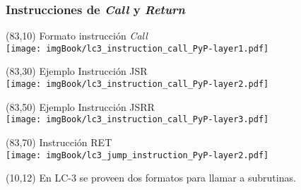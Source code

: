\documentclass[aspectratio=169]{beamer}
\begin{document}
\begin{frame}[t,fragile]
    \frametitle{Instrucciones de \emph{Call} y \emph{Return}}
    \begin{textblock}{65}(83,10)
    \small Formato instrucción \emph{Call}\\ \vspace{0.2cm}
    \texttt{[image: imgBook/lc3\_instruction\_call\_PyP-layer1.pdf]} \end{textblock}
    \begin{textblock}{65}(83,30)
    \small Ejemplo Instrucción JSR\\ \vspace{0.2cm}
    \texttt{[image: imgBook/lc3\_instruction\_call\_PyP-layer2.pdf]} \end{textblock}
    \begin{textblock}{65}(83,50)
    \small Ejemplo Instrucción JSRR\\ \vspace{0.2cm}
    \texttt{[image: imgBook/lc3\_instruction\_call\_PyP-layer3.pdf]} \end{textblock}
    \begin{textblock}{65}(83,70)
    \small Instrucción RET\\ \vspace{0.2cm}
    \texttt{[image: imgBook/lc3\_jump\_instruction\_PyP-layer2.pdf]} \end{textblock}
    \begin{textblock}{65}(10,12)
    En LC-3 se proveen dos formatos para llamar a subrutinas.\\
    \bigskip
    \end{textblock}
\end{frame}
\end{document}
